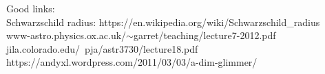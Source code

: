 \documentclass[11pt]{article}
\begin{document}
\noindent
Good links:\\
Schwarzschild radius: https://en.wikipedia.org/wiki/Schwarzschild\_radius\\
www-astro.physics.ox.ac.uk/$\sim$garret/teaching/lecture7-2012.pdf\\
jila.colorado.edu/~pja/astr3730/lecture18.pdf\\
https://andyxl.wordpress.com/2011/03/03/a-dim-glimmer/\\





\end{document}
